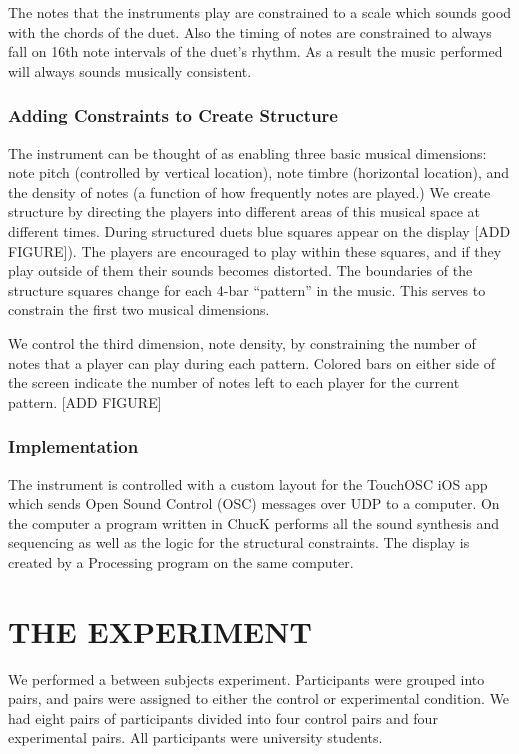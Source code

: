 \documentclass{article}
\begin{document}
The notes that the instruments play are constrained to a scale which sounds good with the chords of the duet.  Also the timing of notes are constrained to always fall on 16th note intervals of the duet’s rhythm.  As a result the music performed will always sounds musically consistent.

\subsubsection{Adding Constraints to Create Structure}

The instrument can be thought of as enabling three basic musical dimensions: note pitch (controlled by vertical location), note timbre (horizontal location), and the density of notes (a function of how frequently notes are played.)  We create structure by directing the players into different areas of this musical space at different times. During structured duets blue squares appear on the display [ADD FIGURE]).  The players are encouraged to play within these squares, and if they play outside of them their sounds becomes distorted.  The boundaries of the structure squares change for each 4-bar “pattern” in the music.  This serves to constrain the first two musical dimensions.

We control the third dimension, note density, by constraining the number of notes that a player can play during each pattern.  Colored bars on either side of the screen indicate the number of notes left to each player for the current pattern. [ADD FIGURE]

\subsubsection{Implementation}

The instrument is controlled with a custom layout for the TouchOSC iOS app which sends Open Sound Control (OSC) messages over UDP to a computer.  On the computer a program written in ChucK performs all the sound synthesis and sequencing as well as the logic for the structural constraints.  The display is created by a Processing program on the same computer.



\section{THE EXPERIMENT}
We performed a between subjects experiment.  Participants were grouped into pairs, and pairs were assigned to either the control or experimental condition.  We had eight pairs of participants divided into four control pairs and four experimental pairs. All participants were university students.
\end{document}

